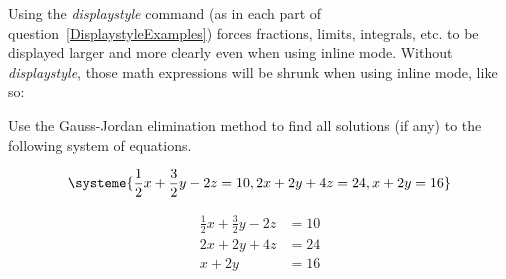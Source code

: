 \documentclass[11pt,addpoints]{exam}
\begin{document}
\begin{questions}



\question
Using the \emph{displaystyle} command (as in each part of question~\ref{DisplaystyleExamples}) forces fractions, limits, integrals, etc. to be displayed larger and more clearly even when using inline mode.  Without \emph{displaystyle}, those math expressions will be shrunk when using inline mode, like so:





\newpage %

\question[8]
Use the Gauss-Jordan elimination method to find all solutions (if any) to the following system of equations.

\begin{equation*}
\systeme{\frac{1}{2}x + \frac{3}{2}y - 2z = 10, 2x + 2y + 4z = 24, x + 2y = 16}
\end{equation*}

\begin{align*}
\frac{1}{2}x + \frac{3}{2}y - 2z & = 10 \\
2x + 2y + 4z & = 24\\
x + 2y &= 16
\end{align*}


\end{questions}
\end{document}
